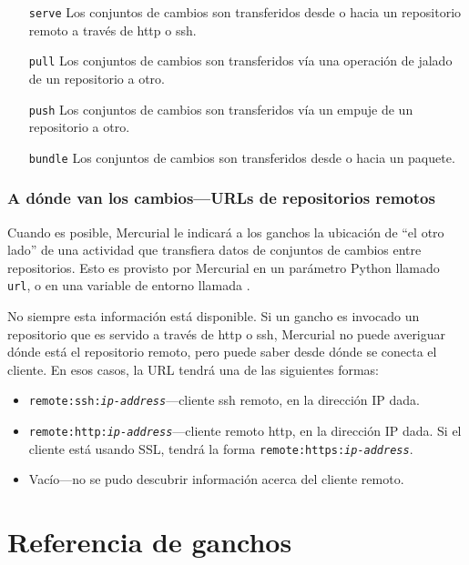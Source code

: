 \begin{itemize}
\item[\texttt{serve}] Los conjuntos de cambios son transferidos desde
  o hacia un repositorio remoto a través de http o ssh.
\item[\texttt{pull}] Los conjuntos de cambios son transferidos vía una
  operación de jalado de un repositorio a otro.
\item[\texttt{push}] Los conjuntos de cambios son transferidos vía un
  empuje de un repositorio a otro.
\item[\texttt{bundle}] Los conjuntos de cambios son transferidos desde
  o hacia un paquete.
\end{itemize}

\subsubsection{A dónde van los cambios---URLs de repositorios remotos}
\label{sec:hook:url}

Cuando es posible, Mercurial le indicará a los ganchos la ubicación de
``el otro lado'' de una actividad que transfiera datos de conjuntos de
cambios entre repositorios. Esto es provisto por Mercurial en un
parámetro Python llamado \texttt{url}, o en una variable de entorno
llamada .

No siempre esta información está disponible. Si un gancho es invocado
un repositorio que es servido a través de http o ssh, Mercurial no
puede averiguar dónde está el repositorio remoto, pero puede saber
desde dónde se conecta el cliente. En esos casos, la URL tendrá una de
las siguientes formas:
\begin{itemize}
\item \texttt{remote:ssh:\emph{ip-address}}---cliente ssh remoto, en
  la dirección IP dada.
\item \texttt{remote:http:\emph{ip-address}}---cliente remoto http, en
  la dirección IP dada. Si el cliente está usando SSL, tendrá la forma
  \texttt{remote:https:\emph{ip-address}}.
\item Vacío---no se pudo descubrir información acerca del cliente
  remoto.
\end{itemize}

\section{Referencia de ganchos}


